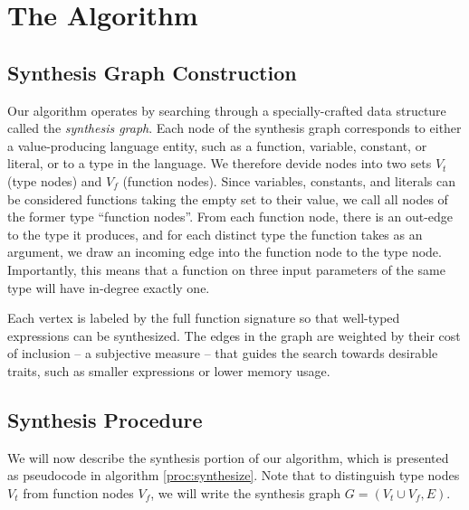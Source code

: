 \section{The Algorithm}
\label{sec:algorithm}
\subsection{Synthesis Graph Construction}
\label{sec:algorithm:graph}

Our algorithm operates by searching through a specially-crafted data
structure called the {\emph{synthesis graph}}. Each node of the synthesis graph
corresponds to either a value-producing language entity, such as a
function, variable, constant, or literal, or to a type in the
language. We therefore devide nodes into two sets $V_t$ (type nodes) and $V_f$ (function nodes). 
Since variables, constants, and literals can be considered
functions taking the empty set to their value, we call all nodes of
the former type ``function nodes''. From each function node, there is 
an out-edge to the type it produces, and for each distinct type the
function takes as an argument, we draw an incoming edge into the
function node to the type node. Importantly, this means that a
function on three input parameters of the same type will have
in-degree exactly one.

Each vertex is labeled by the full function signature so that
well-typed expressions can be synthesized. The edges in the graph are
weighted by their cost of inclusion -- a subjective measure -- that
guides the search towards desirable traits, such as smaller
expressions or lower memory usage.

\iffalse
The algorithm uses two procedures, along with some supporting
subroutines, to accomplish expression repairs by referring to this
graph. The repair algorithm itself degenerates into simple expression
synthesis when presented with an empty broken expression, and as such
subsumes the functionality described in
\cite{GveroETAL13CompleteCompletionTypesWeights}. Furthermore, the
algorithm can be seen as a generalization of the Prospector algorithm
described in \cite{MandelinetALL2005Jungloid}, since their
construction can be embedded within ours if only unary operations and
types are added to the graph.
\fi

\subsection{Synthesis Procedure}
\label{sec:algorithm:synthesis}
We will now describe the synthesis portion of our algorithm, which is
presented as pseudocode in algorithm \ref{proc:synthesize}. Note that
to distinguish type nodes $V_t$ from function nodes $V_f$, we will
write the synthesis graph $G=(V_t \cup V_f, E)$.

